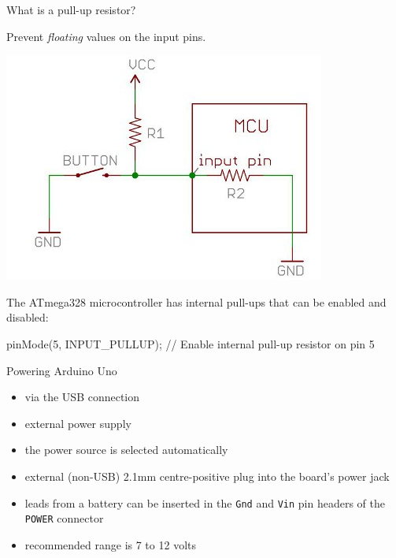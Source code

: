 \documentclass[compress]{beamer}
\begin{document}
\begin{frame}[fragile]{What is a pull-up resistor?}

    Prevent \emph{floating} values on the input pins.

    \begin{center}
        \includegraphics[width=0.5\linewidth]{pullup}
    \end{center}

    The ATmega328 microcontroller has internal pull-ups that can be enabled and disabled:

    \begin{cppcode}
    pinMode(5, INPUT_PULLUP); // Enable internal pull-up resistor on pin 5
    \end{cppcode}

\end{frame}



\begin{frame}{Powering Arduino Uno}
    \begin{itemize}
        \item via the USB connection
        \item external power supply
        \item the power source is selected automatically
        \item external (non-USB) 2.1mm centre-positive plug into the board's
            power jack
        \item leads from a battery can be inserted in the \texttt{Gnd} and
            \texttt{Vin} pin
            headers of the \texttt{POWER} connector
        \item recommended range is 7 to 12 volts
    \end{itemize}
\end{frame}
\end{document}
